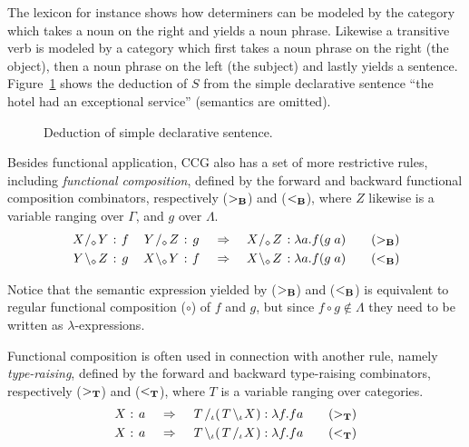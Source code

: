 The lexicon for instance shows how determiners can be modeled by the category which takes a noun on the right and yields a noun phrase. Likewise a transitive verb is modeled by a category which first takes a noun phrase on the right (the object), then a noun phrase on the left (the subject) and lastly yields a sentence. Figure~\ref{fig:simpleSentence} shows the deduction of $S$ from the simple declarative sentence ``the hotel had an exceptional service'' (semantics are omitted).
\vfill
\begin{figure}[ht]
\center
{}
\caption{Deduction of simple declarative sentence.}
\label{fig:simpleSentence}
\end{figure}
\vfill
\clearpage

Besides functional application, CCG also has a set of more restrictive rules, including \emph{functional composition}, defined by the forward and backward functional composition combinators, respectively (${>_{\bf B}}$) and (${<_{\bf B}}$), where $Z$ likewise is a variable ranging over $\Gamma$, and $g$ over $\Lambda$.
\begin{align*}
  \catvar{X}   /_\diamond  \catvar{Y} : \fvar{f} \quad \catvar{Y}  /_\diamond   \catvar{Z} : \fvar{g}
  &\quad\Rightarrow\quad
  \catvar{X}   /_\diamond  \catvar{Z} : \lambda a . f ( g \; a)
  \tag{${>_{\bf B}}$} \\
  \catvar{Y} \bsl_\diamond \catvar{Z} : \fvar{g} \quad \catvar{X} \bsl_\diamond \catvar{Y} : \fvar{f} 
  &\quad\Rightarrow\quad
  \catvar{X} \bsl_\diamond \catvar{Z} : \lambda a . f ( g \; a)
  \tag{${<_{\bf B}}$}
\end{align*}
\vspace{-1.5em}

Notice that the semantic expression yielded by (${>_{\bf B}}$) and (${<_{\bf B}}$) is equivalent to regular functional composition ($\circ$) of $f$ and $g$, but since $f \circ g \not \in \Lambda$ they need to be written as $\lambda$-expressions.

Functional composition is often used in connection with another rule, namely \emph{type-raising}, defined by the forward and backward type-raising combinators, respectively (${>_{\bf T}}$) and (${<_{\bf T}}$), where $T$ is a variable ranging over categories.
\begin{align*}
  \catvar{X} : \fvar{a}
  &\quad\Rightarrow\quad
  \catvar{T}/_\iota ( \catvar{T} \bsl_\iota \catvar{X} ) : \lambda f . f a
  \tag{$>_\mathbf{T}$} \\
  \catvar{X} : \fvar{a}
  &\quad\Rightarrow\quad
  \catvar{T}\bsl_\iota ( \catvar{T} /_\iota \catvar{X} ) : \lambda f . f a
  \tag{$<_\mathbf{T}$}
\end{align*}
\vspace{-1.5em}

